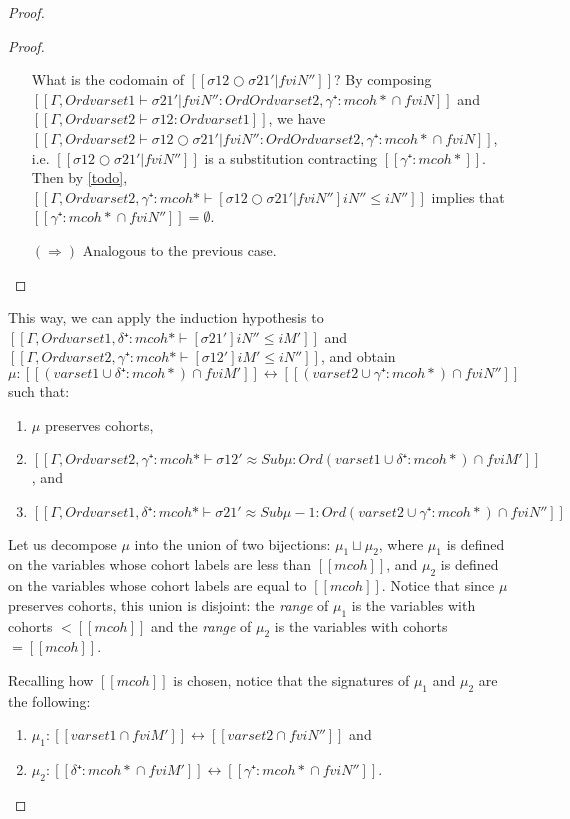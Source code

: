 \begin{proof}
\begin{caseof}
\begin{proof}
\begin{itemize}
        What is the codomain of $[[σ12 ○ σ21'|fv iN'']]$?
        By composing
        $[[Γ, Ord varset1 ⊢ σ21'|fv iN'' : Ord {Ord varset2, γ⁺:mcoh*} ∩ fv iN]]$
        and
        $[[Γ, Ord varset2 ⊢ σ12 : Ord varset1]]$,
        we have
        $[[Γ, Ord varset2 ⊢ σ12 ○ σ21'|fv iN'' : Ord {Ord varset2, γ⁺:mcoh*} ∩
        fv iN]]$, i.e. $[[σ12 ○ σ21'|fv iN'']]$ is a substitution contracting
        $[[γ⁺:mcoh*]]$.
        Then by \cref{todo},
        $[[Γ, Ord varset2, γ⁺:mcoh* ⊢ [σ12 ○ σ21'|fv iN'']iN'' ≤ iN'']]$
        implies that $[[{γ⁺:mcoh*} ∩ fv iN'']] = \emptyset$.
        \item [$(\Rightarrow)$]
          Analogous to the previous case.
      \end{itemize}
    \end{proof}
    This way, we can apply the induction hypothesis to
    $[[Γ, Ord varset1, δ⁺:mcoh* ⊢ [σ21']iN'' ≤ iM']]$ and
    $[[Γ, Ord varset2, γ⁺:mcoh* ⊢ [σ12']iM' ≤ iN'']]$,
    and obtain
    $\mu : [[(varset1 ∪ {δ⁺:mcoh*}) ∩ fv iM']] \leftrightarrow [[(varset2 ∪ {γ⁺:mcoh*}) ∩ fv iN'']]$ such that:
    \begin{enumerate}
    \item $\mu$ preserves cohorts,
    \item $[[Γ, Ord varset2, γ⁺:mcoh* ⊢ σ12' ≈ Sub μ : Ord (varset1 ∪ {δ⁺:mcoh*}) ∩ fv iM' ]]$, and
    \item $[[Γ, Ord varset1, δ⁺:mcoh* ⊢ σ21' ≈ Sub μ-1 : Ord (varset2 ∪ {γ⁺:mcoh*}) ∩ fv iN'']]$
    \end{enumerate}

    Let us decompose $\mu$ into the union of two bijections: $\mu_1 \sqcup
    \mu_2$, where $\mu_1$ is defined on the variables whose cohort labels are less
    than $[[mcoh]]$, and $\mu_2$ is defined on the variables whose cohort labels
    are equal to $[[mcoh]]$. Notice that since $\mu$ preserves cohorts,
    this union is disjoint: the \emph{range} of $\mu_1$ is the variables with cohorts
    $< [[mcoh]]$ and the \emph{range} of $\mu_2$ is the variables with cohorts
    $= [[mcoh]]$.

    Recalling how $[[mcoh]]$ is chosen, notice that the signatures of $\mu_1$ and
    $\mu_2$ are the following:
    \begin{enumerate}
      \item $\mu_1 : [[varset1 ∩ fv iM']] \leftrightarrow [[varset2 ∩ fv iN'']]$ and
      \item $\mu_2 : [[{δ⁺:mcoh*} ∩ fv iM']] \leftrightarrow [[{γ⁺:mcoh*} ∩ fv iN'']]$.
    \end{enumerate}


\end{caseof}
\end{proof}
